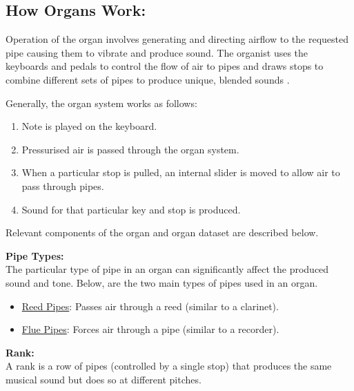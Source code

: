\noindent \subsection{How Organs Work:}
\hspace{0.5cm} Operation of the organ involves generating and directing airflow to the requested pipe causing them to vibrate and produce sound. The organist uses the keyboards and pedals to control the flow of air to pipes and draws stops to combine different sets of pipes to produce unique, blended sounds \cite{organvideo}.

\noindent Generally, the organ system works as follows:
\vspace{-0.15cm}
\begin{enumerate}
    \itemsep0em 
\item Note is played on the keyboard.
\vspace{-0.1cm}
\item Pressurised air is passed through the organ system.
\vspace{-0.1cm}
\item When a particular stop is pulled, an internal slider is moved to allow air to pass through pipes.
\vspace{-0.1cm}
\item Sound for that particular key and stop is produced.
\end{enumerate}
\vspace{-0.1cm}

\noindent Relevant components of the organ and organ dataset are described below. 

\noindent \textbf{Pipe Types:}
\\ \hspace*{0.5cm} The particular type of pipe in an organ can significantly affect the produced sound and tone. Below, are the two main types of pipes used in an organ. 
\vspace{-0.15cm}
\begin{itemize}
    \itemsep0em 
\item \underline{Reed Pipes}: Passes air through a reed (similar to a clarinet).
\item \underline{Flue Pipes}: Forces air through a pipe (similar to a recorder).
\end{itemize}
\vspace{-0.2cm}
\cite{organvideo}

\noindent \textbf{Rank:}
\\ \hspace*{0.5cm} A rank is a row of pipes (controlled by a single stop) that produces the same musical sound but does so at different pitches. 

